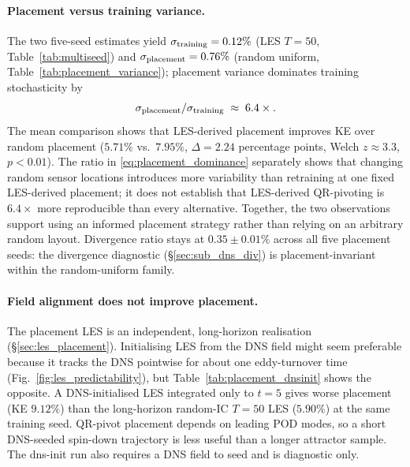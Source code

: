 \paragraph{Placement versus training variance.}
The two five-seed estimates yield $\sigma_{\rm training}=0.12\%$ (LES $T=50$, Table~\ref{tab:multiseed}) and $\sigma_{\rm placement}=0.76\%$ (random uniform, Table~\ref{tab:placement_variance}); placement variance dominates training stochasticity by
\begin{equation}
    \sigma_{\rm placement}/\sigma_{\rm training} \;\approx\; 6.4\times.
    \label{eq:placement_dominance}
\end{equation}
The mean comparison shows that LES-derived placement improves KE over random placement ($5.71\%$ vs.\ $7.95\%$, $\Delta=2.24$ percentage points, Welch $z \approx 3.3$, $p<0.01$). The ratio in \eqref{eq:placement_dominance} separately shows that changing random sensor locations introduces more variability than retraining at one fixed LES-derived placement; it does not establish that LES-derived QR-pivoting is $6.4\times$ more reproducible than every alternative. Together, the two observations support using an informed placement strategy rather than relying on an arbitrary random layout. Divergence ratio stays at $0.35 \pm 0.01\%$ across all five placement seeds: the divergence diagnostic (\S\ref{sec:sub_dns_div}) is placement-invariant within the random-uniform family.

\paragraph{Field alignment does not improve placement.}
The placement LES is an independent, long-horizon realisation (\S\ref{sec:les_placement}). Initialising LES from the DNS field might seem preferable because it tracks the DNS pointwise for about one eddy-turnover time (Fig.~\ref{fig:les_predictability}), but Table~\ref{tab:placement_dnsinit} shows the opposite. A DNS-initialised LES integrated only to $t=5$ gives worse placement (KE $9.12\%$) than the long-horizon random-IC $T=50$ LES ($5.90\%$) at the same training seed. QR-pivot placement depends on leading POD modes, so a short DNS-seeded spin-down trajectory is less useful than a longer attractor sample. The dns-init run also requires a DNS field to seed and is diagnostic only.

